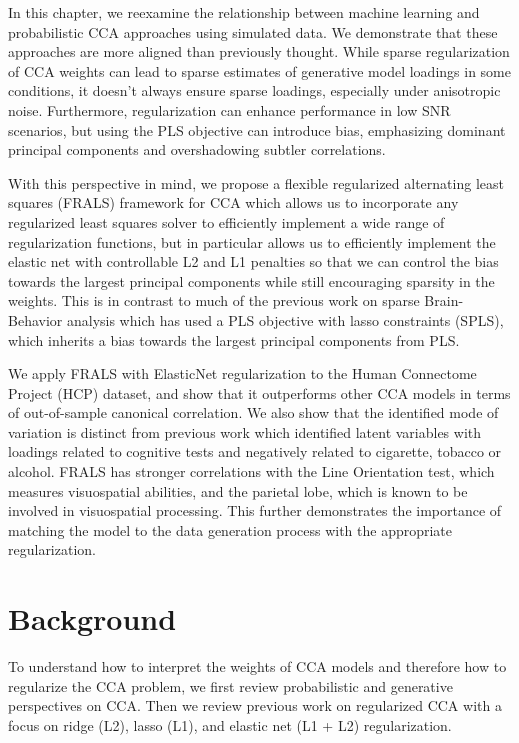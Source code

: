 In this chapter, we reexamine the relationship between machine learning and probabilistic CCA approaches using simulated data. 
We demonstrate that these approaches are more aligned than previously thought. 
While sparse regularization of CCA weights can lead to sparse estimates of generative model loadings in some conditions, it doesn't always ensure sparse loadings, especially under anisotropic noise. 
Furthermore, regularization can enhance performance in low SNR scenarios, but using the PLS objective can introduce bias, emphasizing dominant principal components and overshadowing subtler correlations.

With this perspective in mind, we propose a flexible regularized alternating least squares (FRALS) framework for CCA which allows us to incorporate any regularized least squares solver to efficiently implement a wide range of regularization functions, but in particular allows us to efficiently implement the elastic net with controllable L2 and L1 penalties so that we can control the bias towards the largest principal components while still encouraging sparsity in the weights.
This is in contrast to much of the previous work on sparse Brain-Behavior analysis which has used a PLS objective with lasso constraints (SPLS), which inherits a bias towards the largest principal components from PLS.

We apply FRALS with ElasticNet regularization to the Human Connectome Project (HCP) dataset, and show that it outperforms other CCA models in terms of out-of-sample canonical correlation.
We also show that the identified mode of variation is distinct from previous work which identified latent variables with loadings related to cognitive tests and negatively related to cigarette, tobacco or alcohol\citep{smith2015positive}.
FRALS has stronger correlations with the Line Orientation test, which measures visuospatial abilities, and the parietal lobe, which is known to be involved in visuospatial processing.
This further demonstrates the importance of matching the model to the data generation process with the appropriate regularization.

\section{Background}\label{sec:background}

To understand how to interpret the weights of CCA models and therefore how to regularize the CCA problem, we first review probabilistic and generative perspectives on CCA. Then we review previous work on regularized CCA with a focus on ridge (L2), lasso (L1), and elastic net (L1 + L2) regularization.

